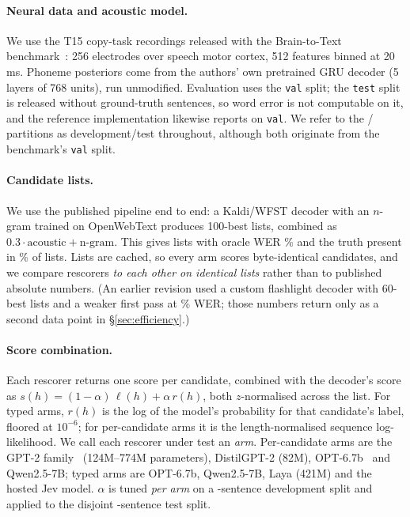 \documentclass[11pt]{article}
\begin{document}
\paragraph{Neural data and acoustic model.} We use the T15 copy-task recordings released
with the Brain-to-Text benchmark~\cite{b2tbench}: 256 electrodes over speech motor cortex,
512 features binned at 20\,ms. Phoneme posteriors come from the authors' own pretrained GRU
decoder (5 layers of 768 units), run unmodified. Evaluation uses the \texttt{val} split; the
\texttt{test} split is released without ground-truth sentences, so word error is not
computable on it, and the reference implementation likewise reports on \texttt{val}.
We refer to the \nDev{}/\nTest{} partitions as development/test throughout, although
both originate from the benchmark's \texttt{val} split.

\paragraph{Candidate lists.} We use the published pipeline end to end: a Kaldi/WFST
decoder with an $n$-gram trained on OpenWebText produces 100-best lists, combined as
$0.3 \cdot \text{acoustic} + \text{n-gram}$. This gives \nLists{} lists with oracle WER
\oracleWer\% and the truth present in \truthInList\% of lists. Lists are cached, so every
arm scores byte-identical candidates, and we compare rescorers \emph{to each other on
identical lists} rather than to published absolute numbers. (An earlier revision used a
custom flashlight decoder with 60-best lists and a weaker first pass at \werNoneWeak\%
WER; those numbers return only as a second data point in \S\ref{sec:efficiency}.)

\paragraph{Score combination.} Each rescorer returns one score per candidate, combined with
the decoder's score as $s(h) = (1-\alpha)\,\ell(h) + \alpha\, r(h)$, both $z$-normalised
across the list. For typed arms, $r(h)$ is the log of the model's probability for that
candidate's label, floored at $10^{-6}$; for per-candidate arms it is the length-normalised
sequence log-likelihood. We call each rescorer under test an \emph{arm}. Per-candidate arms are the GPT-2
family~\cite{radford2019gpt2}
(124M--774M parameters), DistilGPT-2 (82M), OPT-6.7b~\cite{zhang2022opt} and Qwen2.5-7B;
typed arms are OPT-6.7b, Qwen2.5-7B, Laya (421M) and the hosted Jev model. $\alpha$ is tuned
\emph{per arm} on a \nDev-sentence development split and applied to the disjoint
\nTest-sentence test split.
\end{document}
